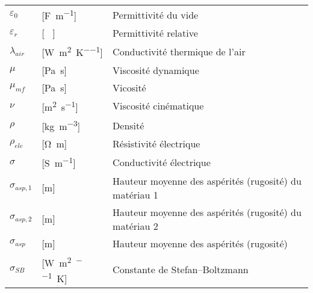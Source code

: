\begin{longtable}{l p{2.5cm} p{4in}}
	$\varepsilon_0$   & [\si{\farad\per\metre}]                             & Permittivité du vide                                                                  \\
	$\varepsilon_r$   & [ \ ]                                               & Permittivité relative                                                                 \\
	$\lambda_{air}$   & [\si{\watt\per\square\metre\per\kelvin}]            & Conductivité thermique de l'air                                                       \\
	$\mu$             & [\si{\pascal\second}]                               & Viscosité dynamique                                                                   \\
	$\mu_{mf}$        & [\si{\pascal\second}]                               & Vicosité                                                                              \\
	$\nu$             & [\si{\square\metre\per\second}]                     & Viscosité cinématique                                                                 \\
	$\rho$            & [\si{\kilogram\per\cubic\metre}]                    & Densité                                                                               \\
	$\rho_{ele}$      & [\si{\ohm\metre}]                                   & Résistivité électrique                                                                          \\
	$\sigma$          & [\si{\siemens\per\metre}]                           & Conductivité électrique                                                               \\
	$\sigma_{asp,1}$  & [\si{\metre}]                                       & Hauteur moyenne des aspérités (rugosité) du matériau 1                                \\
	$\sigma_{asp,2}$  & [\si{\metre}]                                       & Hauteur moyenne des aspérités (rugosité) du matériau 2                                \\
	$\sigma_{asp}$    & [\si{\metre}]                                       & Hauteur moyenne des aspérités (rugosité)                                              \\
	$\sigma_{SB}$     & [\si{\watt\per\square\metre\per\raiseto{4}\kelvin}] & Constante de Stefan–Boltzmann                                                         \\

\end{longtable}
